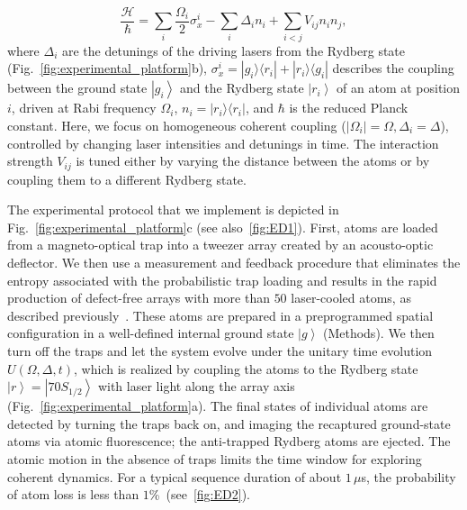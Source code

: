 \documentclass[prl,nobalancelastpage,twocolumn,superscriptaddress,nofootinbib]{revtex4}
\newcommand{\ket}[1]{\left|#1\right\rangle}
\newcommand{\ketbra}[2]{| #1\rangle\langle#2|}
\newcommand{\ham}{\mathcal{H}}
\begin{document}
\begin{equation}
	\label{eq:Rydberg-Hamiltonian}
	\frac{\ham}{\hbar} = \sum_i\frac{\Omega_i}{2}\sigma^i_x-\sum_i \Delta_i n_i +\sum_{i<j}V_{ij}n_in_j,
\end{equation}
where $\Delta_i$ are the detunings of the driving lasers from the Rydberg state
(Fig.~\ref{fig:experimental_platform}b), $\sigma^i_x
=\ketbra{g_i}{r_i}+\ketbra{r_i}{g_i}$ describes the coupling between the ground
state $\ket{g_i}$ and the Rydberg state $\ket{r_i}$ of an atom at position $i$,
driven at Rabi frequency $\Omega_i$, $n_i=\ketbra{r_i}{r_i}$, and $\hbar$ is
the reduced Planck constant. Here, we focus on homogeneous coherent coupling
($\lvert\Omega_i\lvert = \Omega,\Delta_i=\Delta$), controlled by changing laser
intensities and detunings in time.  The interaction strength $V_{ij}$ is tuned
either by varying the distance between the atoms or by coupling them to a
different Rydberg state.

The experimental protocol that we implement is depicted in
Fig.~\ref{fig:experimental_platform}c (see also~\ref{fig:ED1}). First, atoms
are loaded from a magneto-optical trap into a tweezer array created by an
acousto-optic deflector. We then use a measurement and feedback procedure that
eliminates the entropy associated with the probabilistic trap loading and
results in the rapid production of defect-free arrays with more than $50$
laser-cooled atoms, as described previously~\cite{Endres2016}. These atoms are
prepared in a preprogrammed spatial configuration in a well-defined internal
ground state $\ket{g}$ (Methods). We then turn off the traps and let the system
evolve under the unitary time evolution $U(\Omega,\Delta,t)$, which is realized
by coupling the atoms to the Rydberg state $\ket{r} = \ket{70S_{1/2}}$ with
laser light along the array axis (Fig.~\ref{fig:experimental_platform}a). The
final states of individual atoms are detected by turning the traps back on, and
imaging the recaptured ground-state atoms via atomic fluorescence; the
anti-trapped Rydberg atoms are ejected. The atomic motion in the absence of
traps limits the time window for exploring coherent dynamics. For a typical
sequence duration of about $1\,\mu$s, the probability of atom loss is less than
$1$\%~(see~\ref{fig:ED2}).
\end{document}
